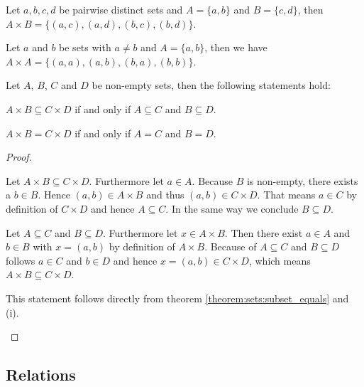 \begin{examples}
    \begin{exampleenumerate}
        \item Let $a,b,c,d$ be pairwise distinct sets and $A=\{a,b\}$ and $B=\{c,d\}$, then $A\times B=\{(a,c),(a,d),(b,c),(b,d)\}$.
        \item Let $a$ and $b$ be sets with $a\neq b$ and $A=\{a,b\}$, then we have $A\times A=\{(a,a),(a,b),(b,a),(b,b)\}$.
    \end{exampleenumerate}
\end{examples}

\begin{theorem}
    Let $A$, $B$, $C$ and $D$ be non-empty sets, then the following statements hold:
    \begin{intheoremenumerate}
        \item $A\times B\subseteq C\times D$ if and only if $A\subseteq C$ and $B\subseteq D$.
        \item $A\times B=C\times D$ if and only if $A=C$ and $B=D$.
    \end{intheoremenumerate}
\end{theorem}

\begin{proof}
    \begin{proofenumerate}
        \item\proofright Let $A\times B\subseteq C\times D$. Furthermore let $a\in A$. Because $B$ is non-empty, there exists a $b\in B$. Hence $(a,b)\in A\times B$ and thus $(a,b)\in C\times D$. That means $a\in C$ by definition of $C\times D$ and hence $A\subseteq C$. In the same way we conclude $B\subseteq D$.
        
        \proofleft Let $A\subseteq C$ and $B\subseteq D$. Furthermore let $x\in A\times B$. Then there exist $a\in A$ and $b\in B$ with $x=(a,b)$ by definition of $A\times B$. Because of $A\subseteq C$ and $B\subseteq D$ follows $a\in C$ and $b\in D$ and hence $x=(a,b)\in C\times D$, which means $A\times B\subseteq C\times D$.

        \item This statement follows directly from theorem \ref{theorem:sets:subset_equals} and (i).
    \end{proofenumerate}
\end{proof}

\subsection{Relations}



